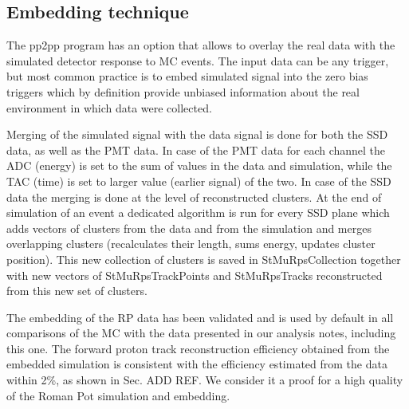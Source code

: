 
\subsection{Embedding technique}

The pp2pp program has an option that allows to overlay the real data with the simulated detector response to MC events. The input data can be any trigger, but most common practice is to embed simulated signal into the zero bias triggers which by definition provide unbiased information about the real environment in which data were collected.

Merging of the simulated signal with the data signal is done for both the SSD data, as well as the PMT data. In case of the PMT data for each channel the ADC (energy) is set to the sum of values in the data and simulation, while the TAC (time) is set to larger value (earlier signal) of the two. In case of the SSD data the merging is done at the level of reconstructed clusters. At the end of simulation of an event a dedicated algorithm is run for every SSD plane which adds vectors of clusters from the data and from the simulation and merges overlapping clusters (recalculates their length, sums energy, updates cluster position). This new collection of clusters is saved in StMuRpsCollection together with new vectors of StMuRpsTrackPoints and StMuRpsTracks reconstructed from this new set of clusters.

The embedding of the RP data has been validated and is used by default in all comparisons of the MC with the data presented in our analysis notes, including this one. The forward proton track reconstruction efficiency obtained from the embedded simulation is consistent with the efficiency estimated from the data within 2\%, as shown in Sec. ADD REF. We consider it a proof for a high quality of the Roman Pot simulation and embedding.